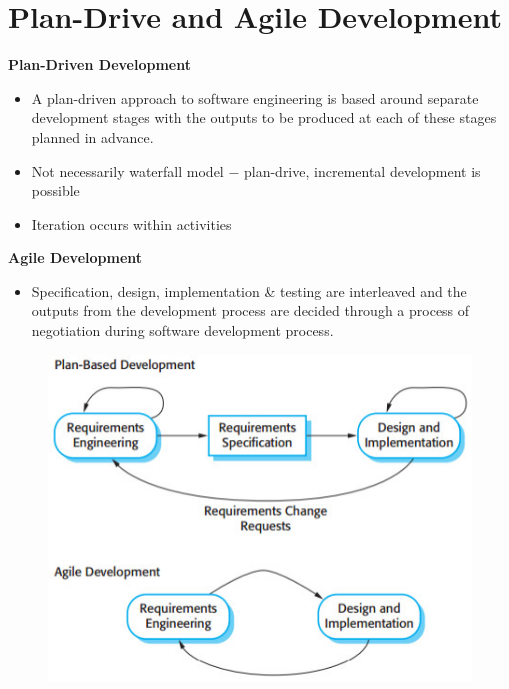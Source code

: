 \documentclass{report}
\begin{document}
\section{Plan-Drive and Agile Development}
\vspace{-1em}
\begin{multicols}{2}
\noindent\textbf{Plan-Driven Development}
\begin{itemize}
  \item A plan-driven approach to software engineering is based around separate development stages with the outputs to be produced at each of these stages planned in advance.
  \item Not necessarily waterfall model $-$ plan-drive, incremental development is possible
  \item Iteration occurs within activities
\end{itemize}  
\textbf{Agile Development}
\begin{itemize}
  \item Specification, design, implementation \& testing are interleaved and the outputs from the development process are decided through a process of negotiation during software development process.
\end{itemize}
\begin{figure}[H]
\centering
\includegraphics[scale=.5,trim=1cm 1cm 1cm 1cm]{assets/CEN4010_Agile_Plan_Driven.jpg}
\end{figure}
\end{multicols}
\end{document}
